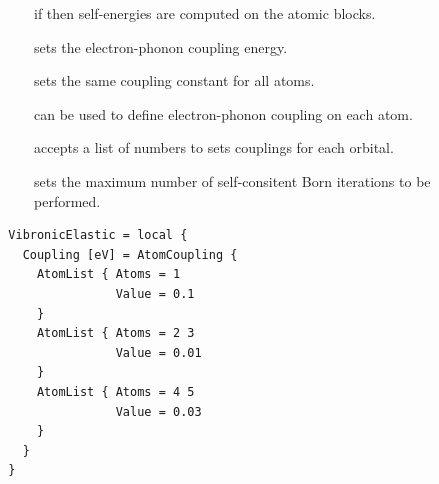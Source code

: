 \begin{description}
\item[] if  then self-energies are computed on the atomic blocks.
\item[] sets the electron-phonon coupling energy.
\item[] sets the same coupling constant for all atoms.
\item[] can be used to define electron-phonon coupling on each atom.
\item[] accepts a list of numbers to sets couplings for each orbital.
\item[] sets the maximum number of self-consitent Born iterations to be performed.	
\end{description}

  \begin{verbatim}
  VibronicElastic = local {
    Coupling [eV] = AtomCoupling {
      AtomList { Atoms = 1
                 Value = 0.1
      }
      AtomList { Atoms = 2 3
                 Value = 0.01
      }
      AtomList { Atoms = 4 5
                 Value = 0.03
      }
    }
  }
  \end{verbatim}





